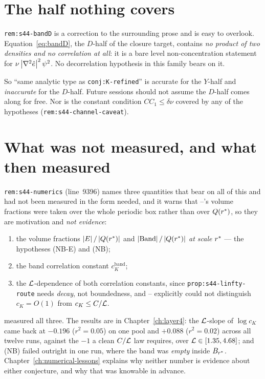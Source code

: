 \section{The half nothing covers}
\label{sec:dhalf}

\texttt{rem:s44-bandD} is a correction to the surrounding prose and is easy to
overlook. Equation~\eqref{eq:bandD}, the \(D\)-half of the closure target,
contains \emph{no product of two densities and no correlation at all}: it is a
bare level non-concentration statement for \(\nu\left|\nabla^2\hat{e}\right|^2\psi^2\).
No decorrelation hypothesis in this family bears on it.

So ``same analytic type as \texttt{conj:K-refined}'' is accurate for the
\(Y\)-half and \emph{inaccurate} for the \(D\)-half. Future sessions should not
assume the \(D\)-half comes along for free. Nor is the constant condition
\(CC_1\le\delta\nu\) covered by any of the hypotheses
(\texttt{rem:s44-channel-caveat}).

\section{What was not measured, and what \texorpdfstring{}{S45} then measured}
\label{sec:s44-numerics}

\texttt{rem:s44-numerics} (line~9396) names three quantities that bear on all
of this and had not been measured in the form needed, and it warns that
--'s volume fractions were taken over the whole periodic box
rather than over \(Q(r^{*})\), so they are motivation and \emph{not evidence}:

\begin{enumerate}[label=(\roman*),leftmargin=2.4em]
\item the volume fractions \(\left|E\right|/\left|Q(r^{*})\right|\) and
  \(\left|\mathrm{Band}\right|/\left|Q(r^{*})\right|\) \emph{at scale} \(r^{*}\) --- the
  hypotheses (NB-E) and (NB);
\item the band correlation constant \(c_K^{\mathrm{band}}\);
\item the \(\mathcal{L}\)-dependence of both correlation constants, since
  \texttt{prop:s44-linfty-route} needs \emph{decay}, not boundedness, and
  -- explicitly could not distinguish \(c_K=O(1)\) from
  \(c_K\le C/\mathcal{L}\).
\end{enumerate}

 measured all three. The results are in Chapter~\ref{ch:layer4}: the
\(\mathcal{L}\)-slope of \(\log c_K\) came back at \(-0.196\) (\(r^2=0.05\)) on one
pool and \(+0.088\) (\(r^2=0.02\)) across all twelve runs, against the \(-1\)
a clean \(C/\mathcal{L}\) law requires, over \(\mathcal{L}\in[1.35,4.68]\); and (NB) failed
outright in one run, where the band was \emph{empty} inside \(B_{r^{*}}\).
Chapter~\ref{ch:numerical-lessons} explains why neither number is evidence
about either conjecture, and why that was knowable in advance.

